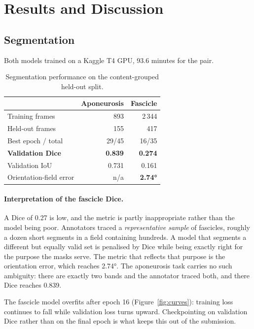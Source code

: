 \documentclass[11pt,a4paper]{article}
\begin{document}
\section{Results and Discussion}
\label{sec:results}

\subsection{Segmentation}
\label{sec:res-seg}

Both models trained on a Kaggle T4 GPU, 93.6 minutes for the pair.

\begin{table}[htbp]
\centering
\caption{Segmentation performance on the content-grouped held-out split.}
\label{tab:seg}
\begin{tabular}{lrr}
\toprule
& \textbf{Aponeurosis} & \textbf{Fascicle} \\
\midrule
Training frames        & 893   & 2\,344 \\
Held-out frames        & 155   & 417 \\
Best epoch / total     & 29/45 & 16/35 \\
\textbf{Validation Dice} & \textbf{0.839} & \textbf{0.274} \\
Validation IoU         & 0.731 & 0.161 \\
Orientation-field error & n/a & \textbf{\ang{2.74}} \\
\bottomrule
\end{tabular}
\end{table}

\paragraph{Interpretation of the fascicle Dice.} A Dice of 0.27 is low, and the
metric is partly inappropriate rather than the model being poor. Annotators
traced a \emph{representative sample} of fascicles, roughly a dozen short
segments in a field containing hundreds. A model that segments a different but
equally valid set is penalised by Dice while being exactly right for the purpose
the masks serve. The metric that reflects that purpose is the orientation error,
which reaches \ang{2.74}. The aponeurosis task carries no such ambiguity:
there are exactly two bands and the annotator traced both, and there Dice
reaches 0.839.

The fascicle model overfits after epoch 16 (Figure~\ref{fig:curves}): training
loss continues to fall while validation loss turns upward. Checkpointing on
validation Dice rather than on the final epoch is what keeps this out of the
submission.
\end{document}
